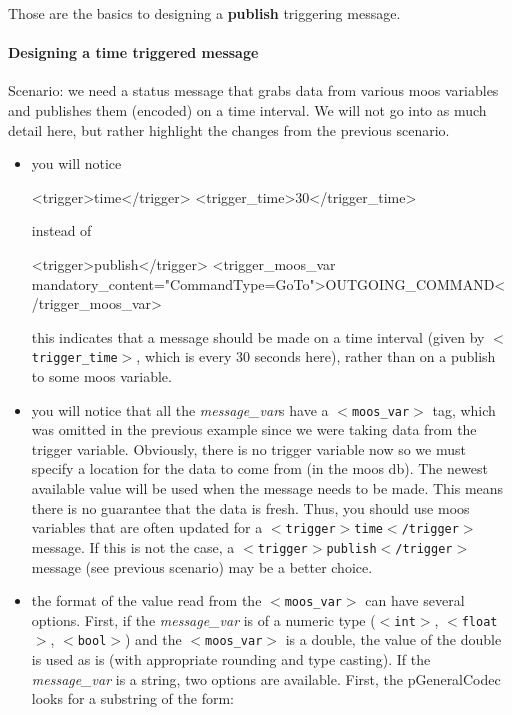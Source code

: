 \documentclass[11pt, letterpaper, oneside]{memoir}
\newcommand{\xmltag}[1]{\texttt{$<$#1$>$}}
\begin{document}
Those are the basics to designing a \textbf{publish} triggering message.

\paragraph{Designing a time triggered message}
Scenario: we need a status message that grabs data from various moos variables and publishes them (encoded) on a time interval. We will not go into as much detail here, but rather highlight the changes from the previous scenario.
\begin{itemize}
\item you will notice
\begin{small}
\begin{boxedverbatim}
    <trigger>time</trigger>
    <trigger_time>30</trigger_time>
\end{boxedverbatim}
\resetbvlinenumber
\end{small}
instead of 
\begin{small}
\begin{boxedverbatim}
    <trigger>publish</trigger>
    <trigger_moos_var mandatory_content="CommandType=GoTo">OUTGOING_COMMAND</trigger_moos_var>
\end{boxedverbatim}
\resetbvlinenumber
\end{small}
this indicates that a message should be made on a time interval (given by \xmltag{trigger\_time}, which is every 30 seconds here), rather than on a publish to some moos variable.
\item you will notice that all the \textit{message\_var}s have a \xmltag{moos\_var} tag, which was omitted in the previous example since we were taking data from the trigger variable. Obviously, there is no trigger variable now so we must specify a location for the data to come from (in the moos db). The newest available value will be used when the message needs to be made. This means there is no guarantee that the data is fresh. Thus, you should use moos variables that are often updated for a \xmltag{trigger$>$time$<$/trigger} message. If this is not the case, a \xmltag{trigger$>$publish$<$/trigger} message (see previous scenario) may be a better choice.
\item the format of the value read from the \xmltag{moos\_var} can have several options. First, if the \textit{message\_var} is of a numeric type (\xmltag{int}, \xmltag{float}, \xmltag{bool}) and the \xmltag{moos\_var} is a double, the value of the double is used as is (with appropriate rounding and type casting). If the \textit{message\_var} is a string, two options are available. First, the pGeneralCodec looks for a substring of the form:

\end{itemize}
\end{document}
